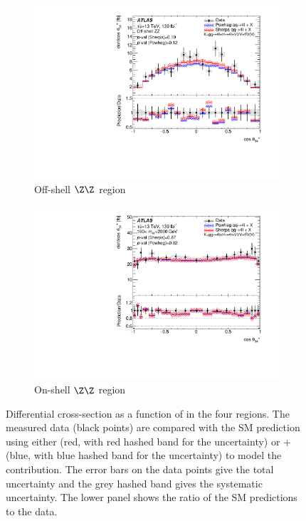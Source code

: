 \begin{figure}[htb!]
\begin{subfigure}{.49\textwidth}
      \includegraphics[width=.99\linewidth]{Figures/m4l/UnfoldedResults/linY_Unfolded_Data_cosThetaStar3_m4loffshell.pdf}  \caption{Off-shell $\Z\Z$ region}\label{fig:sub-third}
    \end{subfigure}
    \begin{subfigure}{.49\textwidth}\centering
      \includegraphics[width=.99\linewidth]{Figures/m4l/UnfoldedResults/linY_Unfolded_Data_cosThetaStar3_m4l180-2000.pdf}  \caption{On-shell $\Z\Z$ region}\label{fig:sub-fourth}
    \end{subfigure}
    \caption{Differential cross-section as a function of \CTSThreeFour{} in the four
        \mFourL{} regions. The measured data (black points) are  compared with the SM prediction using either \SHERPA{} (red, with red hashed band for the uncertainty) or \POWHEG{} + \pythia{} (blue, with blue hashed band for the uncertainty) to model the \qqFourL{} contribution. The error bars on the data points give the total uncertainty and the grey hashed band gives the systematic uncertainty. \Pvalue{} The  lower panel shows the ratio of the SM predictions to the data.}
    \label{fig:cts34_m4l}
\end{figure}

